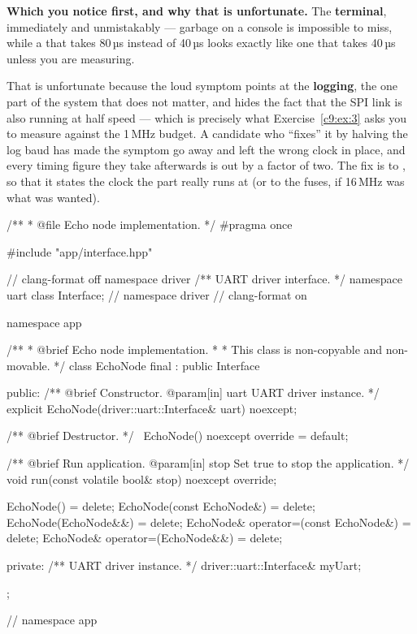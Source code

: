 \textbf{Which you notice first, and why that is unfortunate.} The \textbf{terminal}, immediately and
unmistakably --- garbage on a console is impossible to miss, while a  that takes
80\,µs instead of 40\,µs looks exactly like one that takes 40\,µs unless you are measuring.

That is unfortunate because the loud symptom points at the \textbf{logging}, the one part of the
system that does not matter, and hides the fact that the SPI link is also running at half speed ---
which is precisely what Exercise~\ref{c9:ex:3} asks you to measure against the 1\,MHz budget. A
candidate who ``fixes'' it by halving the log baud has made the symptom go away and left the wrong
clock in place, and every timing figure they take afterwards is out by a factor of two. The fix is to
, so that it states the clock the part really runs at (or to the fuses, if 16\,MHz was
what was wanted).


\begin{cppcode}
/**
 * @file Echo node implementation.
 */
#pragma once

#include "app/interface.hpp"

// clang-format off
namespace driver
{
/** UART driver interface. */
namespace uart { class Interface; }
} // namespace driver
// clang-format on

namespace app
{
/**
 * @brief Echo node implementation.
 *
 *        This class is non-copyable and non-movable.
 */
class EchoNode final : public Interface
{
public:
    /** @brief Constructor. @param[in] uart UART driver instance. */
    explicit EchoNode(driver::uart::Interface& uart) noexcept;

    /** @brief Destructor. */
    ~EchoNode() noexcept override = default;

    /** @brief Run application. @param[in] stop Set true to stop the application. */
    void run(const volatile bool& stop) noexcept override;

    EchoNode()                           = delete;
    EchoNode(const EchoNode&)            = delete;
    EchoNode(EchoNode&&)                 = delete;
    EchoNode& operator=(const EchoNode&) = delete;
    EchoNode& operator=(EchoNode&&)      = delete;

private:
    /** UART driver instance. */
    driver::uart::Interface& myUart;
};
} // namespace app
\end{cppcode}

